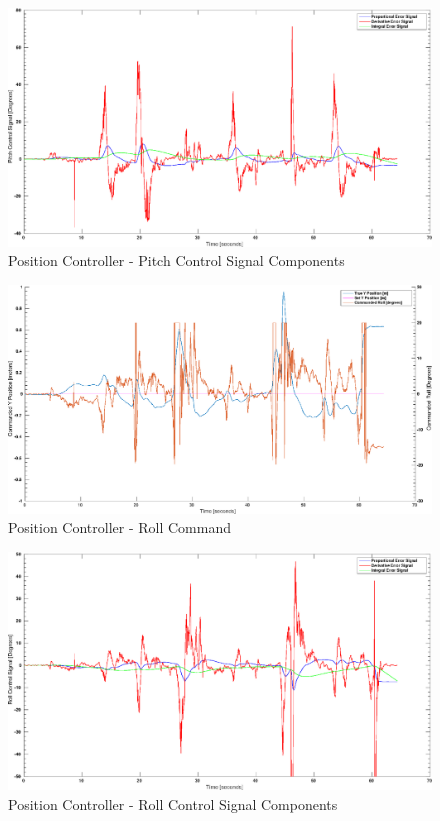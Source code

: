 \documentclass[11pt, twocolumn]{article}
\begin{document}
\begin{figure}
	\centering
	\includegraphics[width=\textwidth]{images/PID_Pitch_Controls.eps}
	\caption{Position Controller - Pitch Control Signal Components}
	\label{fig:pid_roll_error}
\end{figure}

\begin{figure}
	\centering
	\includegraphics[width=\textwidth]{images/PID_Roll_y_true_and_obs.eps}
	\caption{Position Controller - Roll Command}
	\label{fig:pid_pitch_command}
\end{figure}

\begin{figure}
	\centering
	\includegraphics[width=\textwidth]{images/PID_Roll_Controls.eps}
	\caption{Position Controller - Roll Control Signal Components}
	\label{fig:pid_pitch_error}
\end{figure}
\end{document}
